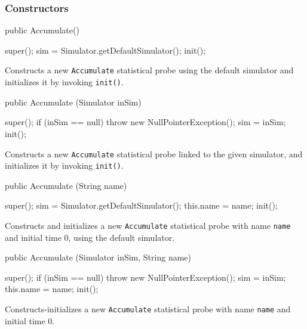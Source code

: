 \subsubsection* {Constructors}
\begin{code}

   public Accumulate() \begin{hide} {
      super();
      sim = Simulator.getDefaultSimulator();
      init();
   } \end{hide}
\end{code}
  \begin{tabb}  Constructs a new \texttt{Accumulate} statistical probe using the
  default simulator and initializes it by invoking \texttt{init()}.
 \end{tabb}
\begin{code}

   public Accumulate (Simulator inSim) \begin{hide} {
      super();
      if (inSim == null)
          throw new NullPointerException();
      sim = inSim;
      init();
   } \end{hide}
\end{code}
  \begin{tabb}  Constructs a new \texttt{Accumulate} statistical probe linked to
    the given simulator,
   and initializes it by invoking \texttt{init()}.
 \end{tabb}
 \begin{htmlonly}
\end{htmlonly}
\begin{code}

   public Accumulate (String name) \begin{hide} {
      super();
      sim = Simulator.getDefaultSimulator();
      this.name = name;
      init();
   } \end{hide}
\end{code}
  \begin{tabb}  Constructs and initializes a new \texttt{Accumulate}
   statistical probe with name \texttt{name} and initial time 0, using the default simulator.
 \end{tabb}
\begin{code}

   public Accumulate (Simulator inSim, String name) \begin{hide} {
      super();
      if (inSim == null)
          throw new NullPointerException();
      sim = inSim;
      this.name = name;
      init();
   } \end{hide}
\end{code}
  \begin{tabb}  Constructs-initializes a new \texttt{Accumulate}
   statistical probe with name \texttt{name} and initial time 0.
 \end{tabb}
\begin{htmlonly}
\end{htmlonly}

